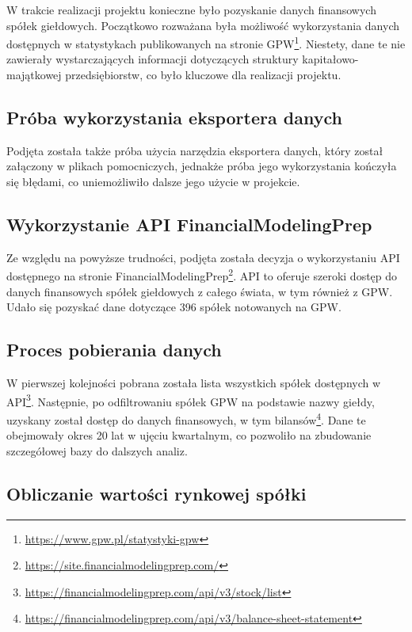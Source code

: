 \documentclass[12pt]{article}
\begin{document}
W trakcie realizacji projektu konieczne było pozyskanie danych finansowych spółek giełdowych. Początkowo rozważana była możliwość wykorzystania danych dostępnych w statystykach publikowanych na stronie GPW\footnote{\url{https://www.gpw.pl/statystyki-gpw}}. Niestety, dane te nie zawierały wystarczających informacji dotyczących struktury kapitałowo-majątkowej przedsiębiorstw, co było kluczowe dla realizacji projektu.

\subsection{Próba wykorzystania eksportera danych}

Podjęta została także próba użycia narzędzia eksportera danych, który został załączony w plikach pomocniczych, jednakże próba jego wykorzystania kończyła się błędami, co uniemożliwiło dalsze jego użycie w projekcie.

\subsection{Wykorzystanie API FinancialModelingPrep}

Ze względu na powyższe trudności, podjęta została decyzja o wykorzystaniu API dostępnego na stronie FinancialModelingPrep\footnote{\url{https://site.financialmodelingprep.com/}}. API to oferuje szeroki dostęp do danych finansowych spółek giełdowych z całego świata, w tym również z GPW. Udało się pozyskać dane dotyczące 396 spółek notowanych na GPW.

\subsection{Proces pobierania danych}

W pierwszej kolejności pobrana została lista wszystkich spółek dostępnych w API\footnote{\url{https://financialmodelingprep.com/api/v3/stock/list}}. Następnie, po odfiltrowaniu spółek GPW na podstawie nazwy giełdy, uzyskany został dostęp do danych finansowych, w tym bilansów\footnote{\url{https://financialmodelingprep.com/api/v3/balance-sheet-statement}}. Dane te obejmowały okres 20 lat w ujęciu kwartalnym, co pozwoliło na zbudowanie szczegółowej bazy do dalszych analiz.

\subsection{Obliczanie wartości rynkowej spółki}
\end{document}
